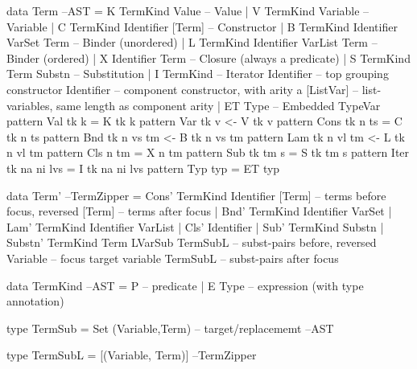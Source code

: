 \begin{code}
data Term                                                                --AST
 = K TermKind Value                    -- Value
 | V TermKind Variable                 -- Variable
 | C TermKind Identifier [Term]        -- Constructor
 | B TermKind Identifier VarSet Term   -- Binder (unordered)
 | L TermKind Identifier VarList Term  -- Binder (ordered)
 | X Identifier Term                   -- Closure (always a predicate)
 | S TermKind Term Substn              -- Substitution
 | I TermKind                          -- Iterator
     Identifier  -- top grouping constructor
     Identifier  -- component constructor, with arity a
     [ListVar]   -- list-variables, same length as component arity
 | ET Type                              -- Embedded TypeVar
pattern Val  tk k          =   K tk k
pattern Var  tk v          <-  V tk v
pattern Cons tk n ts       =   C tk n ts
pattern Bnd  tk n vs tm    <-  B tk n vs tm
pattern Lam  tk n vl tm    <-  L tk n vl tm
pattern Cls     n    tm    =   X n tm
pattern Sub  tk tm s       =   S tk tm s
pattern Iter tk na ni lvs  =   I tk na ni lvs
pattern Typ  typ           =   ET typ
\end{code}

\newpage
\begin{code}
data Term'                                                        --TermZipper
  = Cons'   TermKind Identifier [Term] -- terms before focus, reversed
                                [Term] -- terms after focus
  | Bnd'   TermKind Identifier VarSet
  | Lam'    TermKind Identifier VarList
  | Cls'             Identifier
  | Sub'    TermKind Substn
  | Substn' TermKind Term LVarSub TermSubL  -- subst-pairs before, reversed
                                  Variable -- focus target variable
                                  TermSubL  -- subst-pairs after focus
\end{code}

\begin{code}
data TermKind                                                            --AST
 = P -- predicate
 | E Type -- expression (with type annotation)
\end{code}

\begin{code}
type TermSub = Set (Variable,Term) -- target/replacememt                --AST
\end{code}


\begin{code}
type TermSubL = [(Variable, Term)]                              --TermZipper
\end{code}

